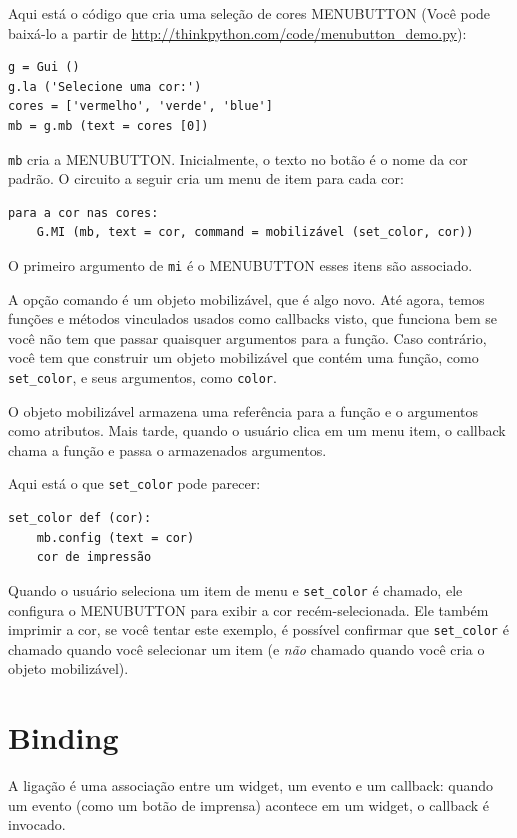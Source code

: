 \documentclass[10pt]{book}
\begin{document}
\begin{exercise}
\begin{v erbatim}
Aqui está o código que cria uma seleção de cores MENUBUTTON
(Você pode baixá-lo a partir de \url{http://thinkpython.com/code/menubutton_demo.py}):

\begin{verbatim}
g = Gui ()
g.la ('Selecione uma cor:')
cores = ['vermelho', 'verde', 'blue']
mb = g.mb (text = cores [0])
\end{verbatim}
%
{\tt mb} cria a MENUBUTTON. Inicialmente, o texto no botão é
o nome da cor padrão. O circuito a seguir cria um menu de
item para cada cor:

\begin{verbatim}
para a cor nas cores:
    G.MI (mb, text = cor, command = mobilizável (set_color, cor))
\end{verbatim}
%
O primeiro argumento de {\tt mi} é o MENUBUTTON esses itens são
associado.

A opção {comando \tt} é um objeto mobilizável, que é algo novo.
Até agora, temos funções e métodos vinculados usados ​​como callbacks visto,
que funciona bem se você não tem que passar quaisquer argumentos para
a função. Caso contrário, você tem que construir um objeto mobilizável
que contém uma função, como \verb "set_color", e seus argumentos,
como {\tt color}.

O objeto mobilizável armazena uma referência para a função e o
argumentos como atributos. Mais tarde, quando o usuário clica em um menu
item, o callback chama a função e passa o armazenados
argumentos.

Aqui está o que \verb "set_color" pode parecer:

\begin{verbatim}
set_color def (cor):
    mb.config (text = cor)
    cor de impressão
\end{verbatim}
%
Quando o usuário seleciona um item de menu e \verb "set_color" é chamado,
ele configura o MENUBUTTON para exibir a cor recém-selecionada.
Ele também imprimir a cor, se você tentar este exemplo, é possível confirmar que
\Verb "set_color" é chamado quando você selecionar um item (e {\em não}
chamado quando você cria o objeto mobilizável).


\section{Binding}

A {\bf} ligação é uma associação entre um widget, um evento e um
callback: quando um evento (como um botão de imprensa) acontece em um widget, o
callback é invocado.


\end{v erbatim}
\end{exercise}
\end{document}
